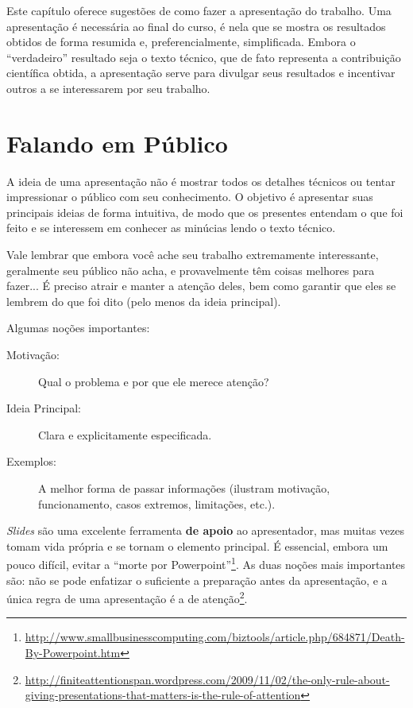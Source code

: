 Este capítulo oferece sugestões de como fazer a apresentação do trabalho. Uma 
apresentação é necessária ao final do curso, é nela que se mostra os resultados
obtidos de forma resumida e, preferencialmente, simplificada. Embora o ``verdadeiro''
resultado seja o texto técnico, que de fato representa a contribuição científica
obtida, a apresentação serve para divulgar seus resultados e incentivar outros a
se interessarem por seu trabalho.

\section{Falando em Público}
A ideia de uma apresentação não é mostrar todos os detalhes técnicos ou tentar
impressionar o público com seu conhecimento. O objetivo é apresentar suas principais
ideias de forma intuitiva, de modo que os presentes entendam o que foi feito e
se interessem em conhecer as minúcias lendo o texto técnico.

Vale lembrar que embora você ache seu trabalho extremamente interessante, 
geralmente seu público não acha, e provavelmente têm coisas melhores para fazer...
É preciso atrair e manter a atenção deles, bem como garantir que eles se lembrem
do que foi dito (pelo menos da ideia principal). 

Algumas noções importantes:
\begin{description}
\item[Motivação:] Qual o problema e por que ele merece atenção?
\item[Ideia Principal:] Clara e explicitamente especificada.
\item[Exemplos:] A melhor forma de passar informações (ilustram motivação, 
funcionamento, casos extremos, limitações, etc.).
\end{description}

\emph{Slides} são uma excelente ferramenta \textbf{de apoio} ao apresentador, mas
muitas vezes tomam vida própria e se tornam o elemento principal. É essencial, 
embora um pouco difícil,  evitar a ``morte por Powerpoint''\footnote{%
\url{http://www.smallbusinesscomputing.com/biztools/article.php/684871/Death-By-Powerpoint.htm}}. 
As duas noções mais importantes são: não se pode enfatizar o suficiente
a preparação antes da apresentação, e a única regra de uma apresentação é a 
de atenção\footnote{\url{http://finiteattentionspan.wordpress.com/2009/11/02/the-only-rule-about-giving-presentations-that-matters-is-the-rule-of-attention}}.

